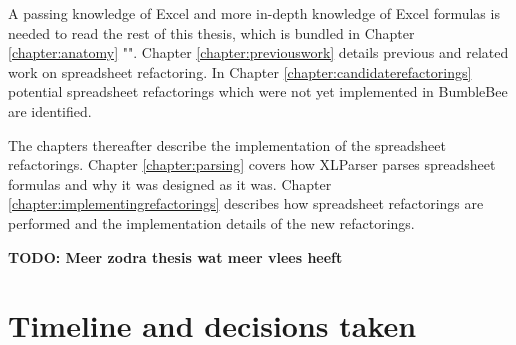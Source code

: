\documentclass[12pt,a4paper,onecolumn,oneside,parskip]{memoir}
\newcommand{\todo}[1]{\textbf{TODO: #1}}
\begin{document}
A passing knowledge of Excel and more in-depth knowledge of Excel formulas is needed to read the rest of this thesis, which is bundled in Chapter \ref{chapter:anatomy} "".
Chapter \ref{chapter:previouswork} details previous and related work on spreadsheet refactoring.
In Chapter \ref{chapter:candidaterefactorings} potential spreadsheet refactorings which were not yet implemented in BumbleBee are identified.

The chapters thereafter describe the implementation of the spreadsheet refactorings.
Chapter \ref{chapter:parsing} covers how XLParser parses spreadsheet formulas and why it was designed as it was.
Chapter \ref{chapter:implementingrefactorings} describes how spreadsheet refactorings are performed and the implementation details of the new refactorings.

\todo{Meer zodra thesis wat meer vlees heeft}

\clearpage
\section{Timeline and decisions taken}
\end{document}
